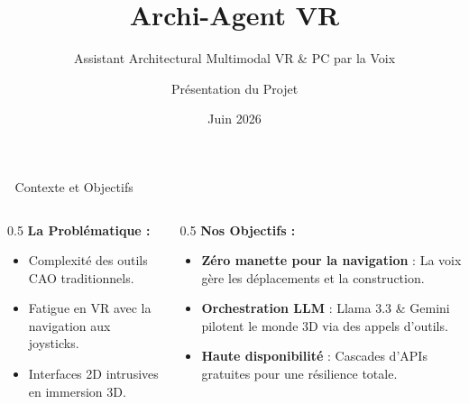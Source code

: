 \documentclass[aspectratio=169]{beamer}
\title[Archi-Agent VR]{Archi-Agent VR}
\subtitle{Assistant Architectural Multimodal VR \& PC par la Voix}
\author[Présentation]{Présentation du Projet}
\institute[Université]{Recherche en Interaction Multimodale}
\date{Juin 2026}
\begin{document}
\begin{frame}
  \titlepage
  
\end{frame}


\begin{frame}{📖 Contexte et Objectifs}
  \begin{columns}
    \begin{column}{0.5\textwidth}
      \textbf{La Problématique :}
      \begin{itemize}
        \item Complexité des outils CAO traditionnels.
        \item Fatigue en VR avec la navigation aux joysticks.
        \item Interfaces 2D intrusives en immersion 3D.
      \end{itemize}
    \end{column}
    \begin{column}{0.5\textwidth}
      \textbf{Nos Objectifs :}
      \begin{itemize}
        \item \textbf{Zéro manette pour la navigation} : La voix gère les déplacements et la construction.
        \item \textbf{Orchestration LLM} : Llama 3.3 \& Gemini pilotent le monde 3D via des appels d'outils.
        \item \textbf{Haute disponibilité} : Cascades d'APIs gratuites pour une résilience totale.
      \end{itemize}
    \end{column}
  \end{columns}

\end{frame}
\end{document}
